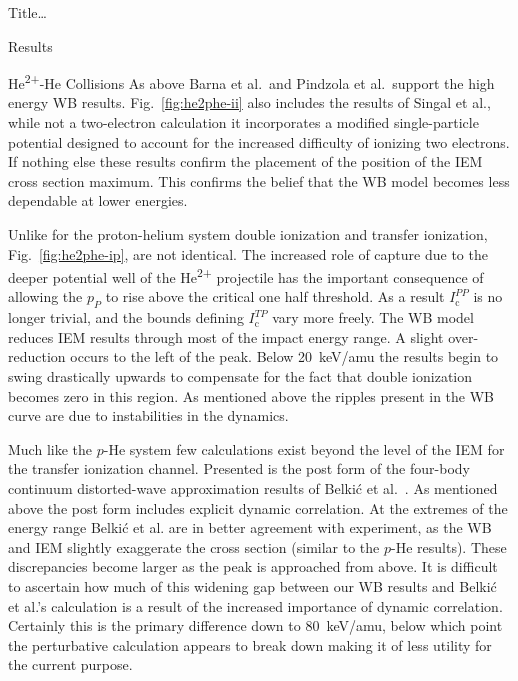 \documentclass[letterpaper, 11 pt]{report}
\begin{document}
\begin{chapter}{ Title\dots \label{chap:p-he2p-he}}
\begin{section}{Results \label{sec:phe2p-res}}
\begin{subsection}{\texorpdfstring{He\textsuperscript{2+}}{He2+}-He Collisions 
                         \label{sec:he2phe-res}}
         As above Barna et al.\ and Pindzola et al.\ support the high energy WB
         results. Fig.~\ref{fig:he2phe-ii} also includes the results of Singal et al., while
         not a two-electron calculation it incorporates a modified single-particle potential designed to
         account for the increased difficulty of ionizing two electrons. If nothing else these results
         confirm the placement of the position of the IEM cross section maximum. This confirms the
         belief that the WB model becomes less dependable at lower energies.

         Unlike for the proton-helium system double ionization and transfer ionization,
         Fig.~\ref{fig:he2phe-ip}, are not identical. The increased role of capture due to the deeper
         potential well of the He\textsuperscript{2+} projectile has the important consequence of
         allowing the $p_P$ to rise above the critical one half threshold. As a result
         $I^{PP}_\mathrm{c}$ is no longer trivial, and the bounds defining $I^{TP}_\mathrm{c}$ vary more
         freely. The WB model reduces IEM results through most of the impact energy range. A slight
         over-reduction occurs to the left of the peak. Below 20~keV/amu the results begin to swing
         drastically upwards to compensate for the fact that double ionization becomes zero in this
         region. As mentioned above the ripples present in the WB curve are due to instabilities in the
         dynamics.

         Much like the $p$-He system few calculations exist beyond the level of the IEM for the transfer
         ionization channel. Presented is the post form of the four-body continuum distorted-wave 
         approximation results of Belki\'{c} et al.~\cite{BMM-97}. As mentioned above the post
         form includes explicit dynamic correlation. At the extremes of the energy range Belki\'{c}
         et al. are in better agreement with experiment, as the WB and IEM slightly exaggerate
         the cross section (similar to the $p$-He results). These discrepancies become larger as the
         peak is approached from above. It is difficult to ascertain how much of this widening gap
         between our WB results and Belki\'{c} et al.'s calculation is a result of the
         increased importance of dynamic correlation. Certainly this is the primary difference down to
         80~keV/amu, below which point the perturbative calculation appears to break down making it of
         less utility for the current purpose.
         

\end{subsection}
\end{section}
\end{chapter}
\end{document}
